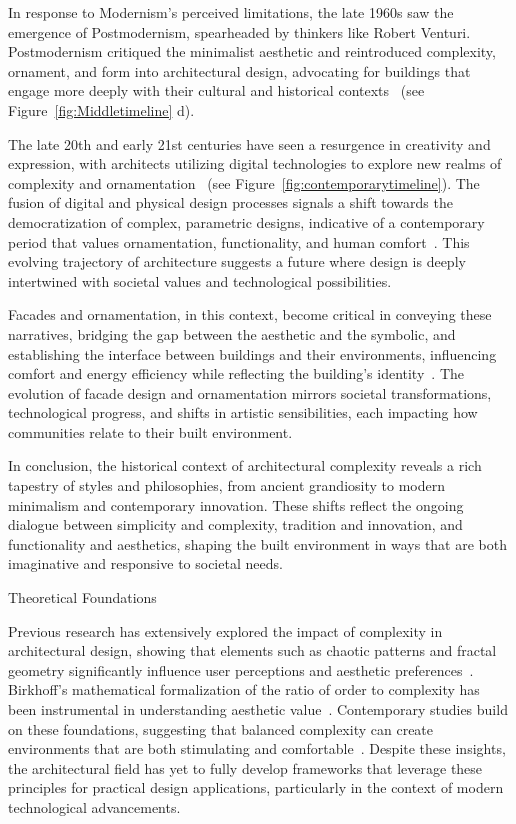 In response to Modernism's perceived limitations, the late 1960s saw the emergence of Postmodernism, spearheaded by thinkers like Robert Venturi.
Postmodernism critiqued the minimalist aesthetic and reintroduced complexity, ornament, and form into architectural design, advocating for buildings that engage more deeply with their cultural and historical contexts~\cite{Venturi1972} (see Figure~\ref{fig:Middletimeline} d).

The late 20th and early 21st centuries have seen a resurgence in creativity and expression, with architects utilizing digital technologies to explore new realms of complexity and ornamentation~\cite{Burlando2019} (see Figure~\ref{fig:contemporarytimeline}).
The fusion of digital and physical design processes signals a shift towards the democratization of complex, parametric designs, indicative of a contemporary period that values ornamentation, functionality, and human comfort~\cite{Schwab2016}.
This evolving trajectory of architecture suggests a future where design is deeply intertwined with societal values and technological possibilities.

Facades and ornamentation, in this context, become critical in conveying these narratives, bridging the gap between the aesthetic and the symbolic, and establishing the interface between buildings and their environments, influencing comfort and energy efficiency while reflecting the building's identity~\cite{Kamal2020}.
The evolution of facade design and ornamentation mirrors societal transformations, technological progress, and shifts in artistic sensibilities, each impacting how communities relate to their built environment.

In conclusion, the historical context of architectural complexity reveals a rich tapestry of styles and philosophies, from ancient grandiosity to modern minimalism and contemporary innovation.
These shifts reflect the ongoing dialogue between simplicity and complexity, tradition and innovation, and functionality and aesthetics, shaping the built environment in ways that are both imaginative and responsive to societal needs.

Theoretical Foundations

Previous research has extensively explored the impact of complexity in architectural design, showing that elements such as chaotic patterns and fractal geometry significantly influence user perceptions and aesthetic preferences~\cite{Bies2016}.
Birkhoff's mathematical formalization of the ratio of order to complexity has been instrumental in understanding aesthetic value~\cite{Birkhoff1933}.
Contemporary studies build on these foundations, suggesting that balanced complexity can create environments that are both stimulating and comfortable~\cite{Redies2015}.
Despite these insights, the architectural field has yet to fully develop frameworks that leverage these principles for practical design applications, particularly in the context of modern technological advancements.


